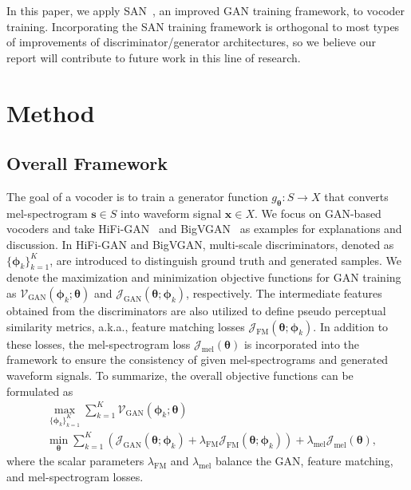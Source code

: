 \documentclass{article}
\newcommand{\Js}{\mathcal{J}}
\begin{document}
In this paper, we apply SAN~\cite{takida2023san}, an improved GAN training framework, to vocoder training. Incorporating the SAN training framework is orthogonal to most types of improvements of discriminator/generator architectures, so we believe our report will contribute to future work in this line of research.

\section{Method}
\label{sec:proposed_method}

\subsection{Overall Framework}
\label{ssec:overall_framework}
The goal of a vocoder is to train a generator function $g_{\bm{\theta}}:S\to X$ that converts mel-spectrogram $\bm{s}\in S$ into waveform signal $\bm{x}\in X$. We focus on GAN-based vocoders and take HiFi-GAN~\cite{kong2020hifigan} and BigVGAN~\cite{lee2023bigvgan} as examples for explanations and discussion. In HiFi-GAN and BigVGAN, multi-scale discriminators, denoted as $\{\bm{\phi}_k\}_{k=1}^K$, are introduced to distinguish ground truth and generated samples. We denote the maximization and minimization objective functions for GAN training as $\mathcal{V}_{\text{GAN}}(\bm{\phi}_k;\bm{\theta})$ and $\Js_{\text{GAN}}(\bm{\theta};\bm{\phi}_k)$, respectively. The intermediate features obtained from the discriminators are also utilized to define pseudo perceptual similarity metrics, a.k.a., feature matching losses $\Js_{\text{FM}}(\bm{\theta};\bm{\phi}_k)$. In addition to these losses, the mel-spectrogram loss $\Js_{\text{mel}}(\bm{\theta})$ is incorporated into the framework to ensure the consistency of given mel-spectrograms and generated waveform signals. To summarize, the overall objective functions can be formulated as
\begin{align}
    &\max_{\{\bm{\phi}_k\}_{k=1}^K}\sum_{k=1}^K\mathcal{V}_{\text{GAN}}(\bm{\phi}_k;\bm{\theta})
    \label{eq:max_problem_vocoder}\\
    &\min_{\bm{\theta}}\sum_{k=1}^K\left(\Js_{\text{GAN}}(\bm{\theta};\bm{\phi}_k)+\lambda_{\text{FM}}\Js_{\text{FM}}(\bm{\theta};\bm{\phi}_k)\right)+\lambda_{\text{mel}}\Js_{\text{mel}}(\bm{\theta}),
    \label{eq:min_problem_vocoder}
\end{align}
where the scalar parameters $\lambda_{\text{FM}}$ and $\lambda_{\text{mel}}$ balance the GAN, feature matching, and mel-spectrogram losses. 
\end{document}
